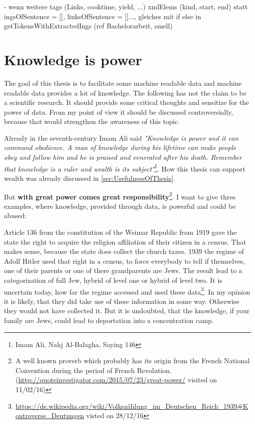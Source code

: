 \documentclass[12pt, twoside]{report}
\begin{document}
- wenn weitere tags (Links, cooktime, yield, ...) xmlElems (kind, start, end) statt ingsOfSentence = [], linksOfSentence = []..., gleiches mit if else in getTokensWithExtractedIngs (ref Bachelorarbeit, smell)

\section{Knowledge is power}
The goal of this thesis is to facilitate some machine readable data and machine readable data provides a lot of knowledge. The following has not the claim to be a scientific research. It should provide some critical thoughts and sensitize for the power of data. From my point of view it should be discussed controversially, because that would strengthen the awareness of this topic.

Already in the seventh-century Imam Ali said \textit{"Knowledge is power and it can command obedience. A man of knowledge during his lifetime can make people obey and follow him and he is praised and venerated after his death. Remember that knowledge is a ruler and wealth is its subject"}\footnote{Imam Ali, Nahj Al-Balagha, Saying 146}. How this thesis can support wealth was already discussed in \cref{sec:UsefulnessOfThesis}.

But \textbf{with great power comes great responsibility}\footnote{A well known proverb which probably has its origin from the French National Convention during the period of French Revolution. (\url{http://quoteinvestigator.com/2015/07/23/great-power/} visited on 11/02/16)}. I want to give three examples, where knowledge, provided through data, is powerful and could be abused:

Article 136 from the constitution of the Weimar Republic from 1919 gave the state the right to acquire the religion affiliation of their citizen in a census. That makes sense, because the state does collect the church taxes. 1939 the regime of Adolf Hitler used that right in a census, to force everybody to tell if themselves, one of their parents or one of there grandparents are Jews. The result lead to a categorization of full Jew, hybrid of level one or hybrid of level two. It is uncertain today, how far the regime accessed and used these data\footnote{\url{https://de.wikipedia.org/wiki/Volkszählung_im_Deutschen_Reich_1939#Kontroverse_Deutungen} visted on 28/12/16}. In my opinion it is likely, that they did take use of these information in some way. Otherwise they would not have collected it. But it is undoubted, that the knowledge, if your family are Jews, could lead to deportation into a concentration camp.
\end{document}
